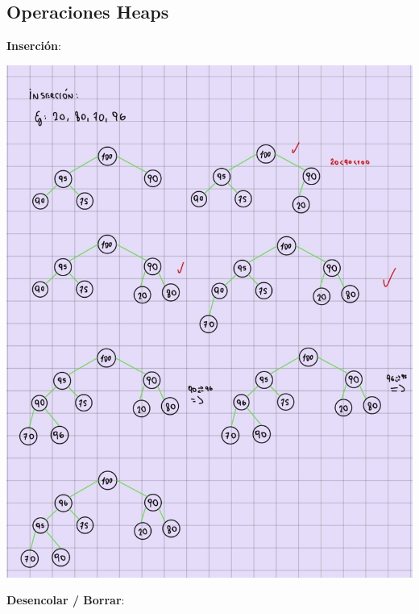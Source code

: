 \documentclass[10pt,a4paper]{article}
\begin{document}
\subsection*{Operaciones Heaps}
\label{subsec:operaciones_heaps}
\textbf{Inserción}:
\begin{center}
    \begin{minipage}[b]{0.5\textwidth}
        \includegraphics[width=\linewidth]{assets/insertando_heaps.jpg}
        \centering
        \label{fig:insertando_en_heaps}
    \end{minipage}
\end{center}
\textbf{Desencolar / Borrar}:
\end{document}
